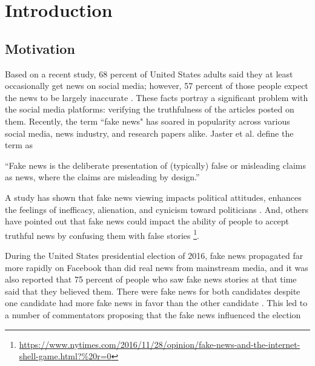 \chapter{Introduction}\label{introduction}

\section{Motivation}\label{intro:motivation}
Based on a recent study, 68 percent of United States adults said they at least occasionally get news on social media; however, 57 percent of those people expect the news to be largely inaccurate \cite{matsa2018news}. These facts portray a significant problem with the social media platforms: verifying the truthfulness of the articles posted on them. Recently, the term ``fake news" has soared in popularity across various social media, news industry, and research papers alike. Jaster et al. define the term as \cite{gelfert2018fake}

\enquote{Fake news is the deliberate presentation of (typically) false or misleading claims as news, where the claims are misleading by design.}

\noindent
A study has shown that fake news viewing impacts political attitudes, enhances the feelings of inefficacy, alienation, and cynicism toward politicians \cite{balmas2014fake}. And, others have pointed out that fake news could impact the ability of people to accept truthful news by confusing them with false stories \footnote{\url{https://www.nytimes.com/2016/11/28/opinion/fake-news-and-the-internet-shell-game.html?\%20r=0}}.

During the United States presidential election of 2016, fake news propagated far more rapidly on Facebook than did real news from mainstream media\cite{silverman2016analysis}, and it was also reported that 75 percent of people who saw fake news stories at that time said that they believed them\cite{silverman2016most}. There were fake news for both candidates despite one candidate had more fake news in favor than the other candidate \cite{silverman2016analysis}. This led to a number of commentators proposing that the fake news influenced the election  \cite{parkinson2016click, read2016donald, dewey2016facebook}

